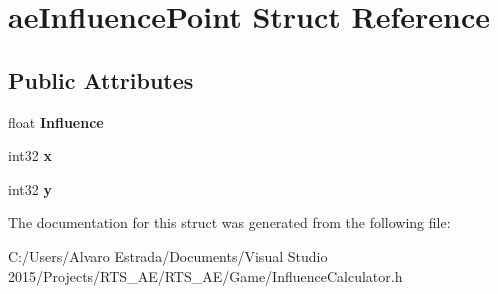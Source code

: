\hypertarget{structae_influence_point}{}\section{ae\+Influence\+Point Struct Reference}
\label{structae_influence_point}
\subsection*{Public Attributes}
\begin{DoxyCompactItemize}
\item 
float {\bfseries Influence}\hypertarget{structae_influence_point_a383de093611ac1428e692d271a1a040b}{}\label{structae_influence_point_a383de093611ac1428e692d271a1a040b}

\item 
int32 {\bfseries x}\hypertarget{structae_influence_point_a81c35fec8cc72f771b194928f56444e3}{}\label{structae_influence_point_a81c35fec8cc72f771b194928f56444e3}

\item 
int32 {\bfseries y}\hypertarget{structae_influence_point_a57ac80f0f5ed9e1fec3486225e355afb}{}\label{structae_influence_point_a57ac80f0f5ed9e1fec3486225e355afb}

\end{DoxyCompactItemize}


The documentation for this struct was generated from the following file\+:\begin{DoxyCompactItemize}
\item 
C\+:/\+Users/\+Alvaro Estrada/\+Documents/\+Visual Studio 2015/\+Projects/\+R\+T\+S\+\_\+\+A\+E/\+R\+T\+S\+\_\+\+A\+E/\+Game/Influence\+Calculator.\+h\end{DoxyCompactItemize}
